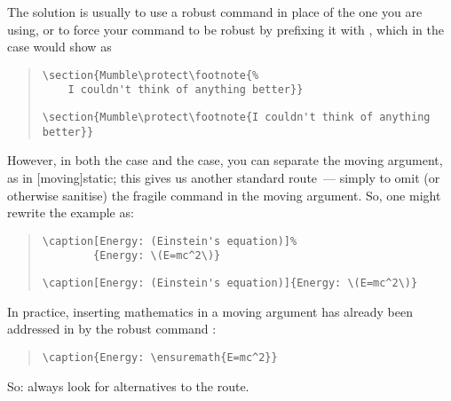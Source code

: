 The solution is usually to use a robust command in place of the one
you are using, or to force your command to be robust by prefixing it
with , which in the  case would show as
\begin{quote}
\begin{narrowversion}
\begin{verbatim}
\section{Mumble\protect\footnote{%
    I couldn't think of anything better}}
\end{verbatim}
\end{narrowversion}
\begin{wideversion}
\begin{verbatim}
\section{Mumble\protect\footnote{I couldn't think of anything better}}
\end{verbatim}
\end{wideversion}
\end{quote}
However, in both the  case and the  case,
you can separate the moving argument, as in
[moving]{static}; this gives us another standard
route~--- simply to omit (or otherwise sanitise) the fragile command
in the moving argument.  So, one might rewrite the 
example as:
\begin{quote}
\begin{narrowversion}
\begin{verbatim}
\caption[Energy: (Einstein's equation)]%
        {Energy: \(E=mc^2\)}
\end{verbatim}
\end{narrowversion}
\begin{wideversion}
\begin{verbatim}
\caption[Energy: (Einstein's equation)]{Energy: \(E=mc^2\)}
\end{verbatim}
\end{wideversion}
\end{quote}
In practice, inserting mathematics in a moving argument has already
been addressed in \LaTeXe{} by the robust command :
\begin{quote}
\begin{verbatim}
\caption{Energy: \ensuremath{E=mc^2}}
\end{verbatim}
\end{quote}
So: always look for alternatives to the  route.

